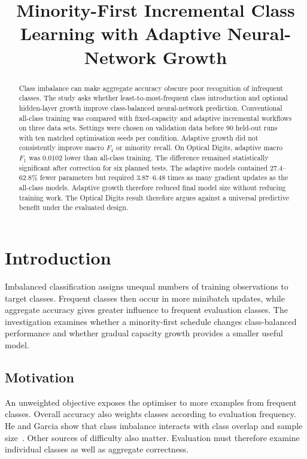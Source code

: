 \documentclass[conference,10pt]{IEEEtran}
\title{Minority-First Incremental Class Learning with Adaptive Neural-Network Growth}
\author{\IEEEauthorblockN{Adriaan den Haan, 27284808}
\IEEEauthorblockA{27284808@sun.ac.za}}
\begin{document}
\maketitle

\begin{abstract}
Class imbalance can make aggregate accuracy obscure poor recognition of infrequent classes. The study asks whether least-to-most-frequent class introduction and optional hidden-layer growth improve class-balanced neural-network prediction. Conventional all-class training was compared with fixed-capacity and adaptive incremental workflows on three data sets. Settings were chosen on validation data before 90 held-out runs with ten matched optimisation seeds per condition. Adaptive growth did not consistently improve macro $F_1$ or minority recall. On Optical Digits, adaptive macro $F_1$ was 0.0102 lower than all-class training. The difference remained statistically significant after correction for six planned tests. The adaptive models contained 27.4--62.8\% fewer parameters but required 3.87--6.48 times as many gradient updates as the all-class models. Adaptive growth therefore reduced final model size without reducing training work. The Optical Digits result therefore argues against a universal predictive benefit under the evaluated design.
\end{abstract}

\section{Introduction}

Imbalanced classification assigns unequal numbers of training observations to target classes. Frequent classes then occur in more minibatch updates, while aggregate accuracy gives greater influence to frequent evaluation classes. The investigation examines whether a minority-first schedule changes class-balanced performance and whether gradual capacity growth provides a smaller useful model.

\subsection{Motivation}

An unweighted objective exposes the optimiser to more examples from frequent classes. Overall accuracy also weights classes according to evaluation frequency. He and Garcia show that class imbalance interacts with class overlap and sample size~\cite{he2009}. Other sources of difficulty also matter. Evaluation must therefore examine individual classes as well as aggregate correctness.
\end{document}
